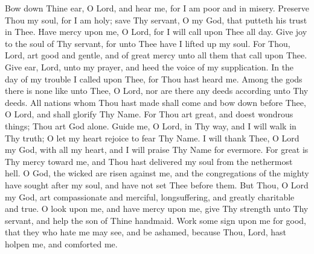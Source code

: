 Bow down Thine ear, O Lord, and hear me, for I am poor and in misery. Preserve Thou my soul, for I am holy; save Thy servant, O my God, that putteth his trust in Thee. Have mercy upon me, O Lord, for I will call upon Thee all day. Give joy to the soul of Thy servant, for unto Thee have I lifted up my soul. For Thou, Lord, art good and gentle, and of great mercy unto all them that call upon Thee. Give ear, Lord, unto my prayer, and heed the voice of my supplication. In the day of my trouble I called upon Thee, for Thou hast heard me. Among the gods there is none like unto Thee, O Lord, nor are there any deeds according unto Thy deeds. All nations whom Thou hast made shall come and bow down before Thee, O Lord, and shall glorify Thy Name. For Thou art great, and doest wondrous things; Thou art God alone. Guide me, O Lord, in Thy way, and I will walk in Thy truth; O let my heart rejoice to fear Thy Name. I will thank Thee, O Lord my God, with all my heart, and I will praise Thy Name for evermore. For great is Thy mercy toward me, and Thou hast delivered my soul from the nethermost hell. O God, the wicked are risen against me, and the congregations of the mighty have sought after my soul, and have not set Thee before them. But Thou, O Lord my God, art compassionate and merciful, longsuffering, and greatly charitable and true. O look upon me, and have mercy upon me, give Thy strength unto Thy servant, and help the son of Thine handmaid. Work some sign upon me for good, that they who hate me may see, and be ashamed, because Thou, Lord, hast holpen me, and comforted me.
